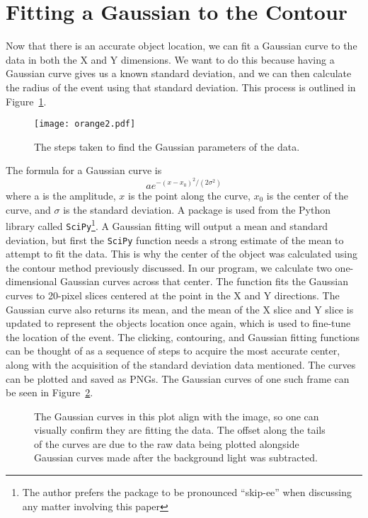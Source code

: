 \section{Fitting a Gaussian to the Contour}
Now that there is an accurate object location, we can fit a Gaussian curve to the data in both the X and Y dimensions. We want to do this because having a Gaussian curve gives us a known standard deviation, and we can then calculate the radius of the event using that standard deviation. This process is outlined in Figure~\ref{fig:gaussianfinder}.

\begin{figure}[h!]
	\centering
	\texttt{[image: orange2.pdf]}
	\caption{The steps taken to find the Gaussian parameters of the data.}
	\label{fig:gaussianfinder}
\end{figure}

The formula for a Gaussian curve is 
\begin{equation}
	ae^{-(x-x_0)^2/(2\sigma^2)}
\end{equation}
where a is the amplitude, $x$ is the point along the curve, $x_0$ is the center of the curve, and $\sigma$ is the standard deviation. A package is used from the Python library called \texttt{SciPy}\footnote{The author prefers the package to be pronounced ``skip-ee'' when discussing any matter involving this paper}. A Gaussian fitting will output a mean and standard deviation, but first the \texttt{SciPy} function needs a strong estimate of the mean to attempt to fit the data. This is why the center of the object was calculated using the contour method previously discussed. In our program, we calculate two one-dimensional Gaussian curves across that center. The function fits the Gaussian curves to 20-pixel slices centered at the point in the X and Y directions. The Gaussian curve also returns its mean, and the mean of the X slice and Y slice is updated to represent the objects location once again, which is used to fine-tune the location of the event. The clicking, contouring, and Gaussian fitting functions can be thought of as a sequence of steps to acquire the most accurate center, along with the acquisition of the standard deviation data mentioned. The curves can be plotted and saved as PNGs. The Gaussian curves of one such frame can be seen in Figure~\ref{fig:testplot}.

\begin{figure}[h!]
	\centering
	\caption{The Gaussian curves in this plot align with the image, so one can visually confirm they are fitting the data. The offset along the tails of the curves are due to the raw data being plotted alongside Gaussian curves made after the background light was subtracted.}
	\label{fig:testplot}
\end{figure}

